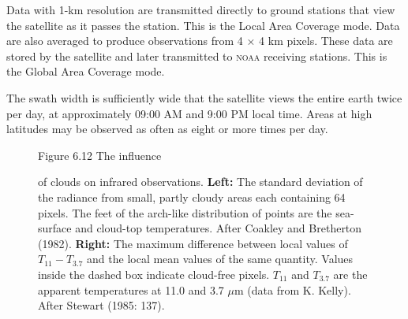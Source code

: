 Data with 1-km resolution are transmitted directly to ground stations that view
the satellite as it passes the station. This is the Local
Area Coverage mode. Data are also averaged to produce observations from 4
$\times$ 4 km pixels. These data are stored by the satellite and later
transmitted to \textsc{noaa} receiving stations. This is the Global Area
Coverage mode.

The swath width is sufficiently wide that the satellite views the entire earth
twice per day, at approximately 09:00 AM and 9:00 PM local time. Areas at high
latitudes may be observed as often as eight or more times per day.

\begin{figure}[b!]
\vspace{-2ex}
\footnotesize
Figure 6.12 The influence \rule{0pt}{4ex}of clouds on infrared observations.
\textbf{Left:} The standard deviation of the radiance from small, partly cloudy
areas each containing 64 pixels. The feet of the arch-like distribution of
points are the sea-surface and cloud-top temperatures. After Coakley and
Bretherton (1982). \textbf{Right:} The maximum difference between local values of
$T_{11} - T_{3.7}$ and the local mean values of the same quantity. Values inside
the dashed box indicate cloud-free pixels. $T_{11}$ and $T_{3.7}$ are the
apparent temperatures at 11.0 and 3.7 $\mu$m (data from K. Kelly). After Stewart
(1985: 137).
\label{fig:cloudalgo}
\end{figure}

